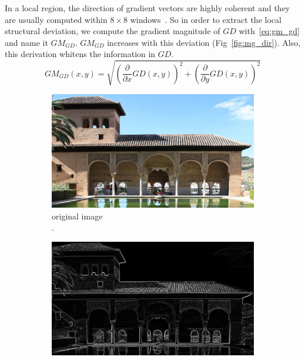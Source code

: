 In a local region, the direction of gradient vectors are highly coherent and they are usually computed within $8\times 8$ windows~\cite{Dalal2005}. So in order to extract the local structural deviation, we compute the gradient magnitude of $GD$ with~\ref{eq:gm_gd} and name it $GM_{GD}$. $GM_{GD}$ increases with this deviation (Fig~\ref{fig:mg_dir}). Also, this derivation whitens the information in $GD$.
\begin{equation}
    GM_{GD}(x, y) = \sqrt{\left(\frac{\partial}{\partial x}GD(x, y) \right)^2+\left(\frac{\partial}{\partial y}GD(x, y) \right)^2}
    \label{eq:gm_gd}
\end{equation}

\begin{figure}
     \centering
     \begin{subfigure}[b]{0.24\textwidth}
         \centering
         \includegraphics[width=\textwidth]{./figs/org009.jpg}
         \caption{original image\\.}
         \label{}
     \end{subfigure}
     \hfill
     \begin{subfigure}[b]{0.24\textwidth}
         \centering
         \includegraphics[width= \textwidth]{./figs/mg_map_ref}

\end{subfigure}
\end{figure}
